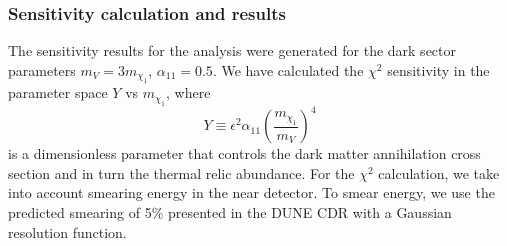 \subsubsection{Sensitivity calculation and results}
The sensitivity results for the analysis were generated for the dark sector parameters  $m_{V}=3m_{\chi_1}$, $\alpha_{11}=0.5$. 
We have calculated the $\chi^{2}$ sensitivity in the parameter space $Y$ vs $m_{\chi_1}$, where 
\begin{equation}
Y\equiv\epsilon^{2}\alpha_{11} (\frac{m_{\chi_1}}{m_{V}})^{4}
\end{equation}
is a dimensionless parameter that controls the dark matter annihilation cross section and in turn the thermal relic abundance. 
For the $\chi^{2}$ calculation, we take into account smearing energy in the  near detector.
To smear energy, we use the predicted smearing of 5$\%$ presented in the DUNE CDR \cite{Acciarri:2015uup} with a Gaussian resolution function.

